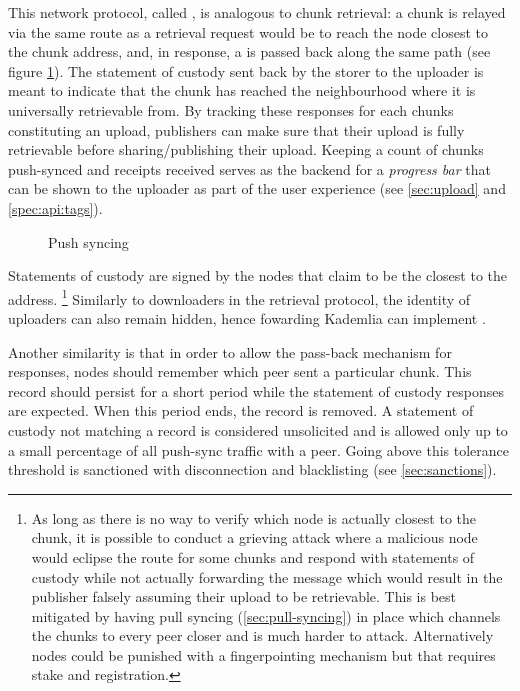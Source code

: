 This network protocol, called , is analogous to chunk retrieval: a chunk is relayed via the same route as a retrieval request would be to reach the node closest to the chunk address, and, in response, a  is passed back along the same path  (see figure \ref{fig:push-syncing}). The statement of custody sent back by the storer to the uploader is meant to indicate that the chunk has reached the neighbourhood where it is universally retrievable from. By tracking these responses for each chunks constituting an upload, publishers can make sure that their upload is fully retrievable before sharing/publishing their upload. Keeping a count of chunks push-synced and receipts received serves as the backend for a \emph{progress bar} that can be shown to the uploader as part of the user experience (see \ref{sec:upload} and \ref{spec:api:tags}).


\begin{figure}[htbp]
   \centering
   \caption[Push syncing]{Push syncing}
   \label{fig:push-syncing}
\end{figure}

Statements of custody are signed by the nodes that claim to be the closest to the address.%
%
\footnote{As long as there is no way to verify  which node is actually closest to the chunk, it is possible to conduct a grieving attack where a malicious node would eclipse the route for some chunks and respond with statements of custody while not actually forwarding the message which would result in the publisher falsely assuming their upload to be retrievable. This is best mitigated by having pull syncing (\ref{sec:pull-syncing}) in place which channels the chunks to every peer closer and is much harder to attack. Alternatively nodes could be punished with a fingerpointing mechanism but that requires stake and registration.}
%
Similarly to downloaders in the retrieval protocol, the identity of uploaders can also remain hidden, hence fowarding Kademlia can implement .

Another similarity is that in order to allow the pass-back mechanism for responses, nodes should remember which peer sent a particular chunk. This record should persist for a short period while the statement of custody responses are expected. When this period ends, the record is removed. A statement of custody not matching a record is considered unsolicited and is allowed only up to a small percentage of all push-sync traffic with a peer. Going above this tolerance threshold is sanctioned with disconnection and blacklisting (see \ref{sec:sanctions}).

